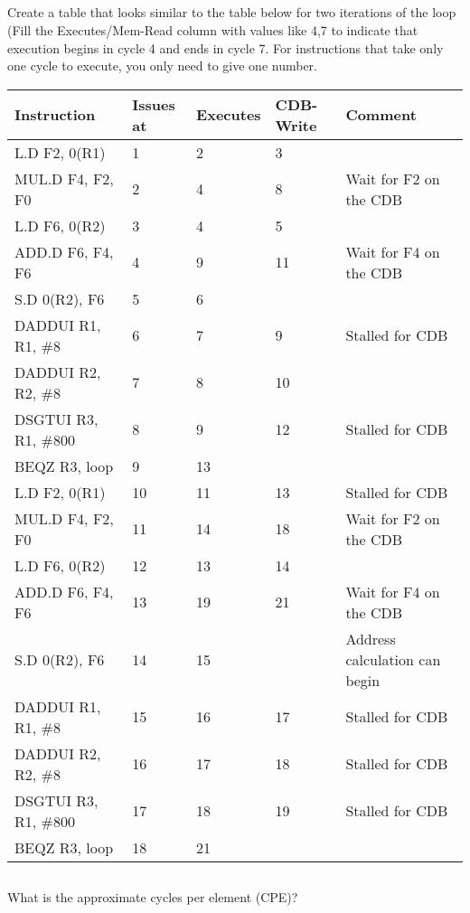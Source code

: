 \documentclass{article}
\begin{document}
\subsection{}

Create a table that looks similar to the table below for two iterations of the loop (Fill the Executes/Mem-Read column with values like 4,7 to indicate that execution begins in cycle 4 and ends in cycle 7. For instructions that take only one cycle to execute, you only need to give one number.

\vspace{5mm} 
\begin{tabular}{|l|p{2cm}|p{2cm}|p{2cm}|l|}
\hline 
\textbf{Instruction} & \textbf{Issues at} & \textbf{Executes} & \textbf{CDB-Write} & \textbf{Comment} \\
\hline
L.D F2, 0(R1) & 1 & 2 & 3 & \\
MUL.D F4, F2, F0 & 2 & 4 & 8 & Wait for F2 on the CDB \\
L.D F6, 0(R2) & 3 & 4 & 5 & \\
ADD.D F6, F4, F6 & 4 & 9 & 11 & Wait for F4 on the CDB\\ 
S.D 0(R2), F6 & 5 & 6 & & \\
DADDUI R1, R1, \#8 & 6 & 7 & 9& Stalled for CDB \\
DADDUI R2, R2, \#8 & 7 & 8 & 10 & \\ 
DSGTUI R3, R1, \#800 & 8 & 9 & 12 & Stalled for CDB \\
\hline
BEQZ R3, loop & 9 & 13 & & \\
\hline
L.D F2, 0(R1) & 10 & 11 & 13 & Stalled for CDB\\
MUL.D F4, F2, F0 & 11 & 14 & 18 & Wait for F2 on the CDB \\
L.D F6, 0(R2) & 12 & 13 & 14 & \\
ADD.D F6, F4, F6 & 13 & 19 & 21 & Wait for F4 on the CDB\\ 
S.D 0(R2), F6 & 14 & 15 & & Address calculation can begin\\
DADDUI R1, R1, \#8 & 15 & 16 & 17& Stalled for CDB\\
DADDUI R2, R2, \#8 & 16 & 17 & 18  & Stalled for CDB\\ 
DSGTUI R3, R1, \#800 & 17 & 18 & 19 & Stalled for CDB\\
\hline
BEQZ R3, loop & 18 & 21 & & \\
\hline
\end{tabular}
\subsection{} 
What is the approximate cycles per element (CPE)? 
\end{document}
